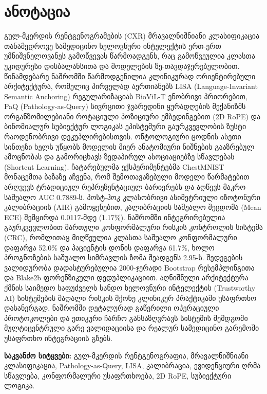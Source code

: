\documentclass[12pt,a4paper,oneside]{report}
\begin{document}
\chapter*{ანოტაცია}
გულ-მკერდის რენტგენოგრამების (CXR) მრავალნიშნიანი კლასიფიკაცია თანამედროვე სამედიცინო ხელოვნური ინტელექტის ერთ-ერთ უმნიშვნელოვანეს გამოწვევას წარმოადგენს, რაც გამოწვეულია კლასთა უკიდურესი დისბალანსითა და მოდელების ზე-თავდაჯერებულობით. წინამდებარე ნაშრომში წარმოდგენილია კლინიკურად ორიენტირებული არქიტექტურა, რომელიც პირველად აერთიანებს LISA (Language-Invariant Semantic Anchoring) რეგულარიზაციას BioViL-T ენობრივი პრიორებით, PaQ (Pathology-as-Query) სივრცითი ჯვარედინი ყურადღების მექანიზმს ორგანზომილებიანი როტაციული პოზიციური ემბედინგებით (2D RoPE) და ბინომიალურ სუბიექტურ ლოგიკას ეპისტემური გაურკვევლობის ზუსტი რაოდენობრივი დეკუპლირებისთვის. ონტოლოგიური ცოდნის ასეთი სინთეზი ხელს უწყობს მოდელის მიერ ანატომიური ნიშნების გააზრებულ ამოცნობას და გამორიცხავს ზედაპირულ ასოციაციებზე სწავლებას (Shortcut Learning).
ჩატარებულმა ექსპერიმენტებმა ChestMNIST მონაცემთა ბაზაზე აჩვენა, რომ შემოთავაზებული მოდელი წარმატებით არღვევს ტრადიციულ რეპრეზენტაციულ ბარიერებს და აღწევს მაკრო-საშუალო AUC 0.7889-ს. პოსტ-ჰოკ კლასობრივი ასიმეტრიული იზოტონური კალიბრაციის (AIR) გამოყენებით, კალიბრაციის საშუალო შეცდომა (Mean ECE) შემცირდა 0.0117-მდე (1.17\%). ნაშრომში ინტეგრირებულია გაურკვევლობით მართული კონფორმალური რისკის კონტროლის სისტემა (CRC), რომლითაც მიღწეულია კლასთა საშუალო კონფორმალური დაფარვა 52.0\% და პაციენტის დონის დაფარვა 61.7\%, ხოლო პროგნოზების საშუალო სიმრავლის ზომა შეადგენს 2.95-ს. შედეგების ვალიდურობა დადასტურებულია 2000-ჯერადი Bootstrap რესემპლინგითა და Blake2b ფორენზიკული დედუპლიკაციით. აღნიშნული არქიტექტურა ქმნის საიმედო საფუძველს სანდო ხელოვნური ინტელექტის (Trustworthy AI) სისტემების მაღალი რისკის მქონე კლინიკურ პრაქტიკაში უსაფრთხო დასანერგად. ნაშრომში დეტალურად გაწერილი ოპერაციული პროტოკოლები და ეთიკური ჩარჩო განსაზღვრავს სისტემის შემდგომი მულტიცენტრული გარე ვალიდაციისა და რეალურ სამედიცინო გარემოში უსაფრთხო ინტეგრაციის გზებს.

\noindent\textbf{საკვანძო სიტყვები:}
გულ-მკერდის რენტგენოგრაფია, მრავალნიშნიანი კლასიფიკაცია, Pathology-as-Query, LISA, კალიბრაცია, ევიდენციური ღრმა სწავლება, კონფორმალური უსაფრთხოება, 2D RoPE, სუბიექტური ლოგიკა.
\end{document}
